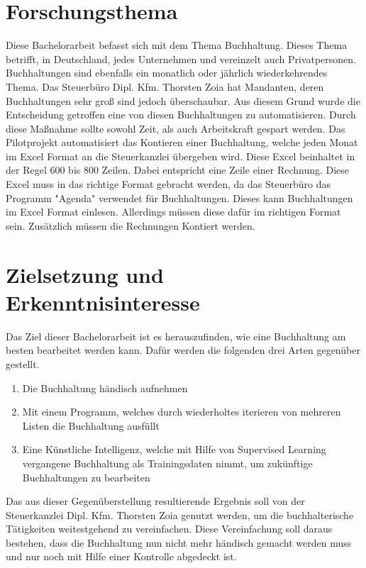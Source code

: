 \documentclass[hidelinks,12pt,a4paper]{article}
\begin{document}
	
	\maketitle
	\thispagestyle{empty}
	
	\newpage
	\pagestyle{headings}	
	
	
	\newpage
	\setcounter{page}{1}

\section{Forschungsthema}
Diese Bachelorarbeit befasst sich mit dem Thema Buchhaltung. Dieses Thema betrifft, in Deutschland, jedes Unternehmen und vereinzelt auch Privatpersonen. Buchhaltungen sind ebenfalls ein monatlich oder jährlich wiederkehrendes Thema.
\newline 
Das Steuerbüro Dipl. Kfm. Thorsten Zoia hat Mandanten, deren Buchhaltungen sehr groß sind jedoch überschaubar. Aus diesem Grund wurde die Entscheidung getroffen eine von diesen Buchhaltungen zu automatisieren. Durch diese Maßnahme sollte sowohl Zeit, als auch Arbeitskraft gespart werden.
\newline 
Das Pilotprojekt automatisiert das Kontieren einer Buchhaltung, welche jeden Monat im Excel Format an die Steuerkanzlei übergeben wird. Diese Excel beinhaltet in der Regel 600 bis 800 Zeilen. Dabei entspricht eine Zeile einer Rechnung. 
\newline 
Diese Excel muss in das richtige Format gebracht werden, da das Steuerbüro das Programm "Agenda" verwendet für Buchhaltungen. Dieses kann Buchhaltungen im Excel Format einlesen. Allerdings müssen diese dafür im richtigen Format sein. Zusätzlich müssen die Rechnungen Kontiert werden. 


\section{Zielsetzung und Erkenntnisinteresse}
Das Ziel dieser Bachelorarbeit ist es herauszufinden, wie eine Buchhaltung am besten bearbeitet werden kann. Dafür werden die folgenden drei Arten gegenüber gestellt. 
\begin{enumerate}
	\item Die Buchhaltung händisch aufnehmen
	\item Mit einem Programm, welches durch wiederholtes iterieren von mehreren Listen die Buchhaltung ausfüllt
	\item Eine Künstliche Intelligenz, welche mit Hilfe von Supervised Learning vergangene Buchhaltung als Trainingsdaten nimmt, um zukünftige Buchhaltungen zu bearbeiten
\end{enumerate}
Das aus dieser Gegenüberstellung resultierende Ergebnis soll von der Steuerkanzlei Dipl. Kfm. Thorsten Zoia genutzt werden, um die buchhalterische Tätigkeiten weitestgehend zu vereinfachen. Diese Vereinfachung soll daraus bestehen, dass die Buchhaltung nun nicht mehr händisch gemacht werden muss und nur noch mit Hilfe einer Kontrolle abgedeckt ist. 
\end{document}
